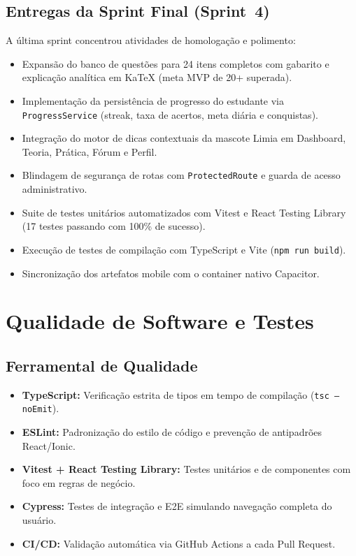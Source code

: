 \documentclass[12pt, a4paper]{article}
\begin{document}
\subsection{Entregas da Sprint Final (Sprint~4)}

A \'{u}ltima sprint concentrou atividades de homologa\c{c}\~{a}o e polimento:

\begin{itemize}[leftmargin=2cm]
  \item Expans\~{a}o do banco de quest\~{o}es para 24 itens completos com gabarito e explica\c{c}\~{a}o anal\'{i}tica em KaTeX (meta MVP de 20+ superada).
  \item Implementa\c{c}\~{a}o da persist\^{e}ncia de progresso do estudante via \texttt{ProgressService} (streak, taxa de acertos, meta di\'{a}ria e conquistas).
  \item Integra\c{c}\~{a}o do motor de dicas contextuais da mascote Limia em Dashboard, Teoria, Pr\'{a}tica, F\'{o}rum e Perfil.
  \item Blindagem de seguran\c{c}a de rotas com \texttt{ProtectedRoute} e guarda de acesso administrativo.
  \item Suite de testes unit\'{a}rios automatizados com Vitest e React Testing Library (17 testes passando com 100\% de sucesso).
  \item Execu\c{c}\~{a}o de testes de compila\c{c}\~{a}o com TypeScript e Vite (\texttt{npm run build}).
  \item Sincroniza\c{c}\~{a}o dos artefatos mobile com o container nativo Capacitor.
\end{itemize}

\section{Qualidade de Software e Testes}

\subsection{Ferramental de Qualidade}

\begin{itemize}[leftmargin=2cm]
  \item \textbf{TypeScript:} Verifica\c{c}\~{a}o estrita de tipos em tempo de compila\c{c}\~{a}o (\texttt{tsc --noEmit}).
  \item \textbf{ESLint:} Padroniza\c{c}\~{a}o do estilo de c\'{o}digo e preven\c{c}\~{a}o de antipadr\~{o}es React/Ionic.
  \item \textbf{Vitest + React Testing Library:} Testes unit\'{a}rios e de componentes com foco em regras de neg\'{o}cio.
  \item \textbf{Cypress:} Testes de integra\c{c}\~{a}o e E2E simulando navega\c{c}\~{a}o completa do usu\'{a}rio.
  \item \textbf{CI/CD:} Valida\c{c}\~{a}o autom\'{a}tica via GitHub Actions a cada Pull Request.
\end{itemize}
\end{document}
